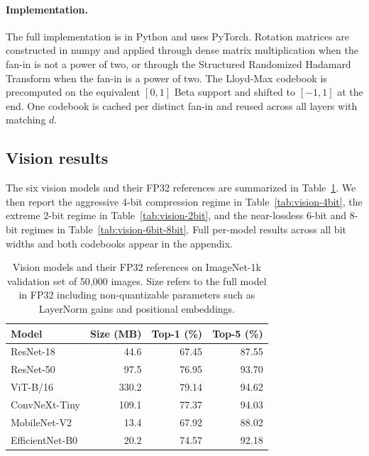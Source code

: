 \paragraph{Implementation.}
The full implementation is in Python and uses PyTorch. Rotation
matrices are constructed in numpy and applied through dense matrix
multiplication when the fan-in is not a power of two, or through the
Structured Randomized Hadamard Transform when the fan-in is a power
of two. The Lloyd-Max codebook is precomputed on the equivalent
$[0, 1]$ Beta support and shifted to $[-1, 1]$ at the end. One
codebook is cached per distinct fan-in and reused across all layers
with matching $d$.

\subsection{Vision results}
\label{sec:experiments-vision}

The six vision models and their FP32 references are summarized in
Table~\ref{tab:vision-fp32}. We then report the aggressive 4-bit
compression regime in Table~\ref{tab:vision-4bit}, the extreme 2-bit
regime in Table~\ref{tab:vision-2bit}, and the near-lossless 6-bit
and 8-bit regimes in Table~\ref{tab:vision-6bit-8bit}. Full
per-model results across all bit widths and both codebooks appear in
the appendix.

\begin{table}[t]
\centering
\caption{Vision models and their FP32 references on ImageNet-1k
validation set of 50,000 images. Size refers to the full model in
FP32 including non-quantizable parameters such as LayerNorm gains
and positional embeddings.}
\label{tab:vision-fp32}
\begin{tabular}{lrrr}
\hline
Model & Size (MB) & Top-1 (\%) & Top-5 (\%) \\
\hline
ResNet-18 \citep{he2016resnet} & 44.6 & 67.45 & 87.55 \\
ResNet-50 \citep{he2016resnet} & 97.5 & 76.95 & 93.70 \\
ViT-B/16 \citep{dosovitskiy2021vit} & 330.2 & 79.14 & 94.62 \\
ConvNeXt-Tiny \citep{liu2022convnext} & 109.1 & 77.37 & 94.03 \\
MobileNet-V2 \citep{sandler2018mobilenetv2} & 13.4 & 67.92 & 88.02 \\
EfficientNet-B0 \citep{tan2019efficientnet} & 20.2 & 74.57 & 92.18 \\
\hline
\end{tabular}
\end{table}

